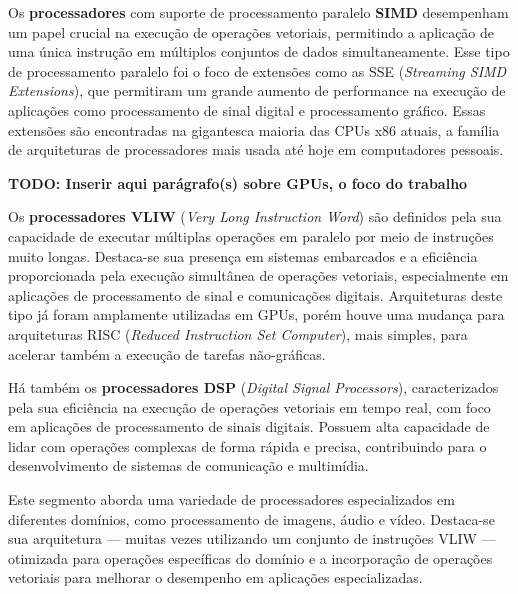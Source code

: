 \documentclass[12pt,
openright, 
oneside, %
a4paper,    %
brazil]{facom-ufu-abntex2}
\begin{document}
Os \textbf{processadores} com suporte de processamento paralelo \textbf{SIMD} desempenham um papel crucial na execução de operações vetoriais, permitindo a aplicação de uma única instrução em múltiplos conjuntos de dados simultaneamente. Esse tipo de processamento paralelo foi o foco de extensões como as SSE (\textit{Streaming SIMD Extensions}), que permitiram um grande aumento de performance na execução de aplicações como processamento de sinal digital e processamento gráfico. Essas extensões são encontradas na gigantesca maioria das CPUs x86 atuais, a família de arquiteturas de processadores mais usada até hoje em computadores pessoais.


\textbf{TODO: Inserir aqui parágrafo(s) sobre GPUs, o foco do trabalho}

Os \textbf{processadores VLIW} (\textit{Very Long Instruction Word}) são definidos pela sua capacidade de executar múltiplas operações em paralelo por meio de instruções muito longas. Destaca-se sua presença em sistemas embarcados e a eficiência proporcionada pela execução simultânea de operações vetoriais, especialmente em aplicações de processamento de sinal e comunicações digitais. Arquiteturas deste tipo já foram amplamente utilizadas em GPUs, porém houve uma mudança para arquiteturas RISC (\textit{Reduced Instruction Set Computer}), mais simples, para acelerar também a execução de tarefas não-gráficas.

Há também os \textbf{processadores DSP} (\textit{Digital Signal Processors}), caracterizados pela sua eficiência na execução de operações vetoriais em tempo real, com foco em aplicações de processamento de sinais digitais. Possuem alta capacidade de lidar com operações complexas de forma rápida e precisa, contribuindo para o desenvolvimento de sistemas de comunicação e multimídia.

Este segmento aborda uma variedade de processadores especializados em diferentes domínios, como processamento de imagens, áudio e vídeo. Destaca-se sua arquitetura --- muitas vezes utilizando um conjunto de instruções VLIW --- otimizada para operações específicas do domínio e a incorporação de operações vetoriais para melhorar o desempenho em aplicações especializadas.

\end{document}
